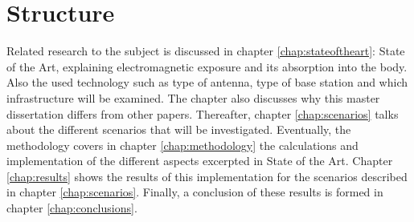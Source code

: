 \section{Structure}
\label{sec:structure}
Related research to the subject is discussed in chapter \ref{chap:stateoftheart}: State of the Art, explaining
electromagnetic exposure and its absorption into the body. Also the used technology such as type of antenna, type of base station and 
which infrastructure will be examined. The chapter also discusses why this master dissertation differs from other papers.
Thereafter, chapter \ref{chap:scenarios} talks about the different scenarios that will be investigated. 
Eventually, the methodology covers in chapter \ref{chap:methodology} the calculations and implementation of the different aspects excerpted in State of the Art.
Chapter \ref{chap:results} shows the results of this 
implementation for the scenarios described in chapter \ref{chap:scenarios}. 
Finally, a conclusion of these results is formed in chapter \ref{chap:conclusions}.

